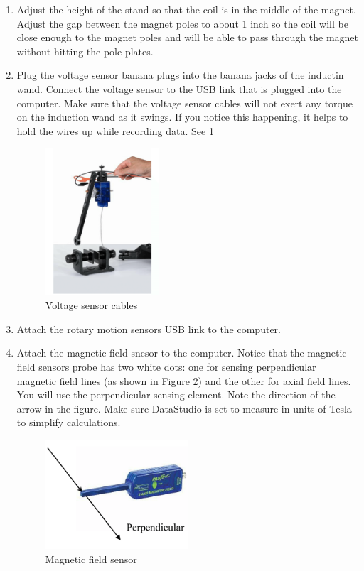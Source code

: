 \begin{enumerate}
 \item Adjust the height of the stand so that the coil is in the middle of the magnet. Adjust the gap between the magnet poles to about 1 inch so the coil will be close enough to the magnet poles and will be able to pass through the magnet without hitting the pole plates.
 \item Plug the voltage sensor banana plugs into the banana jacks of the inductin wand. Connect the voltage sensor to the USB link that is plugged into the computer. Make sure that the voltage sensor cables will not exert any torque on the induction wand as it swings. If you notice this happening, it helps to hold the wires up while recording data. See \ref{fig:voltage_cables}

 \begin{figure}[h]
 \centering
 \includegraphics[width=0.4\textwidth]{./Exp4/pic/voltage_cables.png}
 \caption{Voltage sensor cables}
 \label{fig:voltage_cables}
 \end{figure}

 \item Attach the rotary motion sensors USB link to the computer.
 \item Attach the magnetic field snesor to the computer. Notice that the magnetic field sensors probe has two white dots: one for sensing perpendicular magnetic field lines (as shown in Figure \ref{fig:mag_sensor}) and the other for axial field lines. You will use the perpendicular sensing element. Note the direction of the arrow in the figure. Make sure DataStudio is set to measure in units of Tesla to simplify calculations.

 \begin{figure}[h]
 \centering
 \includegraphics[width=0.5\textwidth]{./Exp4/pic/mag_sensor.png}
 \caption{Magnetic field sensor}
 \label{fig:mag_sensor}
 \end{figure}


\end{enumerate}
